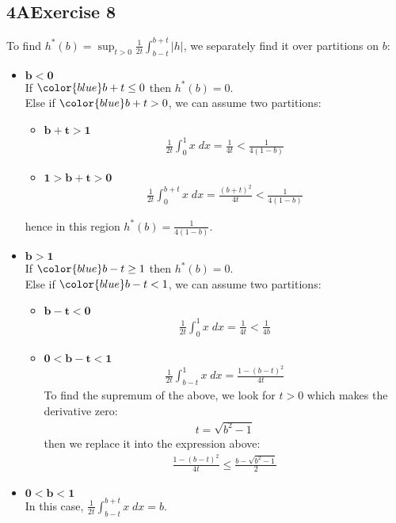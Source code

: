 \documentclass[12pt, letterpaper]{article}
\begin{document}
\subsection*{4\hspace{1pt}A\hspace{20pt}Exercise 8}
To find $h^*(b)=\sup_{t>0}\frac{1}{2t}\int_{b-t}^{b+t}|h|$, we separately find it over partitions on $b$:
\begin{itemize}
    \item $\mathbf{b<0}$\\
    If  $\color{blue}b+t\leq0$ then $h^*(b)=0$.\\
    Else if $\color{blue}b+t>0$, we can assume two partitions:
    \begin{itemize}[label={}]
        \item $\mathbf{b+t>1}$
        \begin{align*}
            \frac{1}{2t}\int_0^1x\;dx=\frac{1}{4t}<\frac{1}{4(1-b)}
        \end{align*}
        \item $\mathbf{1>b+t>0}$
        \begin{align*}
            \frac{1}{2t}\int_0^{b+t}x\;dx=\frac{(b+t)^2}{4t}<\frac{1}{4(1-b)}
        \end{align*}
    \end{itemize}
    hence in this region $h^*(b)=\frac{1}{4(1-b)}$.
    
    \item $\mathbf{b>1}$\\
    If  $\color{blue}b-t\geq1$ then $h^*(b)=0$.\\
    Else if $\color{blue}b-t<1$, we can assume two partitions:
    \begin{itemize}[label={}]
        \item $\mathbf{b-t<0}$
        \begin{align*}
            \frac{1}{2t}\int_0^1x\;dx=\frac{1}{4t}<\frac{1}{4b}
        \end{align*}
        \item $\mathbf{0<b-t<1}$
        \begin{align*}
            \frac{1}{2t}\int_{b-t}^{1}x\;dx=\frac{1-(b-t)^2}{4t}
        \end{align*}
        To find the supremum of the above, we look for $t>0$ which makes the derivative zero:
        \begin{align*}
            t=\sqrt{b^2-1}
        \end{align*}
        then we replace it into the expression above:
        \begin{align*}
            \frac{1-(b-t)^2}{4t}\leq\frac{b-\sqrt{b^2-1}}{2}
        \end{align*}
    \end{itemize}

    \item $\mathbf{0<b<1}$\\
    In this case, $\frac{1}{2t}\int_{b-t}^{b+t}x\;dx=b$.
\end{itemize}
\end{document}
